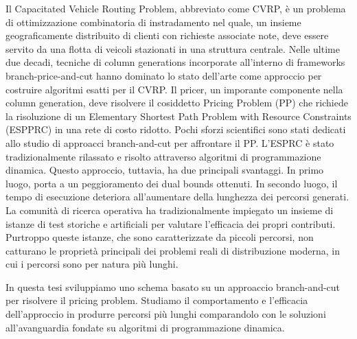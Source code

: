 \noindent Il Capacitated Vehicle Routing Problem, abbreviato come CVRP,
è un problema di ottimizzazione combinatoria di instradamento nel quale,
un insieme geograficamente distribuito di clienti con richieste associate note,
deve essere servito da una flotta di veicoli stazionati in una struttura centrale.
Nelle ultime due decadi,
tecniche di column generations incorporate all'interno di frameworks branch-price-and-cut
hanno dominato lo stato dell'arte come approccio
per costruire algoritmi esatti per il CVRP.
Il pricer, un imporante componente nella column generation, deve risolvere
il cosiddetto Pricing Problem (PP) che richiede la risoluzione di un
Elementary Shortest Path Problem with Resource Constraints (ESPPRC)
in una rete di costo ridotto.
Pochi sforzi scientifici sono stati dedicati allo studio di approacci
branch-and-cut per affrontare il PP.
L'ESPRC è stato tradizionalmente rilassato e risolto attraverso algoritmi di programmazione dinamica.
Questo approccio, tuttavia, ha due principali svantaggi.
In primo luogo, porta a un peggioramento dei dual bounds ottenuti.
In secondo luogo, il tempo di esecuzione deteriora all'aumentare della lunghezza dei percorsi generati.
La comunità di ricerca operativa ha tradizionalmente impiegato
un insieme di istanze di test storiche e artificiali per valutare
l'efficacia dei propri contributi.
Purtroppo queste istanze, che sono caratterizzate da piccoli percorsi,
non catturano le proprietà principali dei problemi reali di distribuzione moderna,
in cui i percorsi sono per natura più lunghi.

\noindent In questa tesi sviluppiamo
uno schema basato su un approaccio branch-and-cut per risolvere il pricing problem.
Studiamo il comportamento e l'efficacia dell'approccio in produrre percorsi più lunghi
comparandolo con le soluzioni all'avanguardia fondate su algoritmi di programmazione dinamica.
